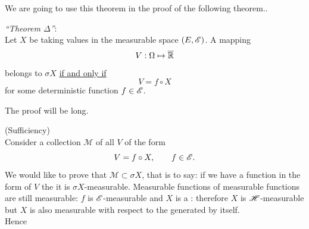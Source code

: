 \documentclass{report}
\begin{document}
	We are going to use this theorem in the proof of the following theorem..
	\begin{theorem}\label{teodelta}
		\emph{``Theorem $\Delta$''}:\\
		Let $X$ be \rv{} taking values in the measurable space $(E,\mathscr{E})$. A mapping
		\[V:\Omega\mapsto\overline{\mathbb{R}}\]
		belongs to $\sigma X$ \underline{if and only if}
		\[V=f\circ X\]
		for some deterministic function $f\in\mathscr{E}$.
	\end{theorem}
The proof will be long.
\begin{fancyproof}
	(Sufficiency)\\
	Consider a collection $\mathcal{M}$ of all $V$ of the form 
	\[V=f\circ X,\qquad f\in\mathscr{E}.\]
	We would like to prove that $\mathcal{M}\subset\sigma X$, that is to say: if we have a function in the form of $V$ the it is $\sigma X$-measurable. Measurable functions of measurable functions are still measurable: $f$ is $\mathscr{E}$-measurable and $X$ is a \rv: therefore $X$ is $\mathscr{H}$-measurable but $X$ is also measurable with respect to the \sa{} generated by itself.\\
	Hence
	

\end{fancyproof}
\end{document}
